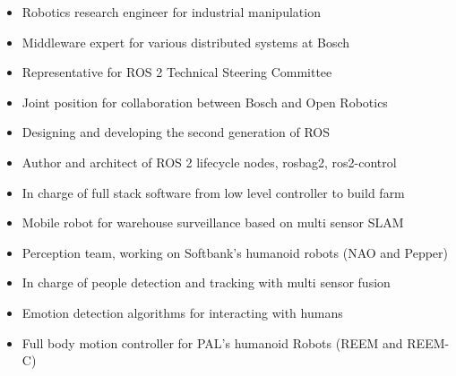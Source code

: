 \documentclass[11pt,a4paper,sans]{moderncv} %
\begin{document}
\begin{itemize}
\setlength{\itemindent}{1in}
\item Robotics research engineer for industrial manipulation
\item Middleware expert for various distributed systems at Bosch
\item Representative for ROS 2 Technical Steering Committee
\end{itemize}

\begin{itemize}
\setlength{\itemindent}{1in}
\item Joint position for collaboration between Bosch and Open Robotics
\item Designing and developing the second generation of ROS
\item Author and architect of ROS 2 lifecycle nodes, rosbag2, ros2-control
\end{itemize}

\begin{itemize}
\setlength{\itemindent}{1in}
\item In charge of full stack software from low level controller to build farm
\item Mobile robot for warehouse surveillance based on multi sensor SLAM
\end{itemize}

\begin{itemize}
\setlength{\itemindent}{1in}
\item Perception team, working on Softbank’s humanoid robots (NAO and Pepper)
\item In charge of people detection and tracking with multi sensor fusion
\item Emotion detection algorithms for interacting with humans
\end{itemize}

\begin{itemize}
\setlength{\itemindent}{1in}
\item Full body motion controller for PAL’s humanoid Robots (REEM and REEM-C)
\end{itemize}
\end{document}

